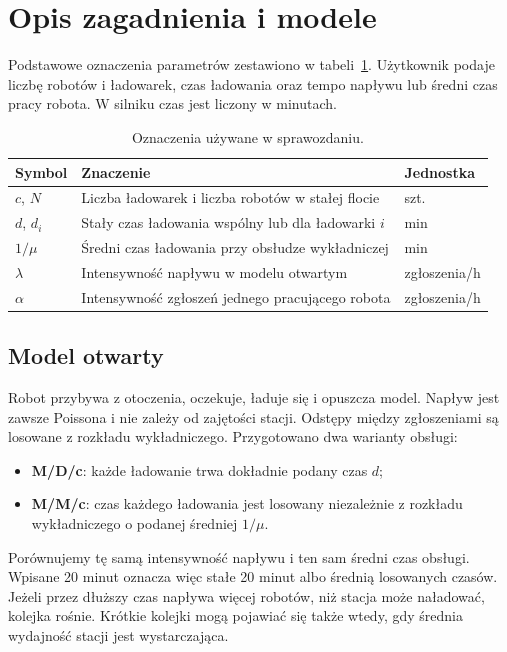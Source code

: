 \documentclass[11pt,a4paper]{article}
\begin{document}
\section{Opis zagadnienia i modele}
Podstawowe oznaczenia parametrów zestawiono w tabeli~\ref{tab:symbols}. Użytkownik podaje liczbę robotów i ładowarek, czas ładowania oraz tempo napływu lub średni czas pracy robota. W silniku czas jest liczony w minutach.
\begin{table}[H]
\centering\small
\begin{tabularx}{\linewidth}{lXl}
\toprule
Symbol & Znaczenie & Jednostka \\
\midrule
$c$, $N$ & Liczba ładowarek i liczba robotów w stałej flocie & szt. \\
$d$, $d_i$ & Stały czas ładowania wspólny lub dla ładowarki $i$ & min \\
$1/\mu$ & Średni czas ładowania przy obsłudze wykładniczej & min \\
$\lambda$ & Intensywność napływu w modelu otwartym & zgłoszenia/h \\
$\alpha$ & Intensywność zgłoszeń jednego pracującego robota & zgłoszenia/h \\
\bottomrule
\end{tabularx}
\caption{Oznaczenia używane w sprawozdaniu.}\label{tab:symbols}
\end{table}

\subsection{Model otwarty}
Robot przybywa z otoczenia, oczekuje, ładuje się i opuszcza model. Napływ jest zawsze Poissona i nie zależy od zajętości stacji. Odstępy między zgłoszeniami są losowane z rozkładu wykładniczego. Przygotowano dwa warianty obsługi:
\begin{itemize}
\item \textbf{M/D/c}: każde ładowanie trwa dokładnie podany czas $d$;
\item \textbf{M/M/c}: czas każdego ładowania jest losowany niezależnie z rozkładu wykładniczego o podanej średniej $1/\mu$.
\end{itemize}
Porównujemy tę samą intensywność napływu i ten sam średni czas obsługi. Wpisane 20 minut oznacza więc stałe 20 minut albo średnią losowanych czasów. Jeżeli przez dłuższy czas napływa więcej robotów, niż stacja może naładować, kolejka rośnie. Krótkie kolejki mogą pojawiać się także wtedy, gdy średnia wydajność stacji jest wystarczająca.
\end{document}
